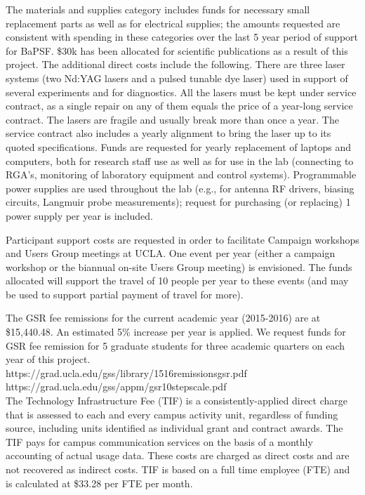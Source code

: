 \documentclass[11pt]{article}
\begin{document}
The materials and supplies category includes funds for necessary small
replacement parts as well as for electrical supplies; the amounts
requested are consistent with spending in these categories over the
last 5 year period of support for BaPSF. \$30k has been
allocated for scientific publications as a result of this project. The
additional direct costs include the following.  There are three laser
systems (two Nd:YAG lasers and a pulsed tunable dye laser) used in
support of several experiments and for diagnostics. All the lasers
must be kept under service contract, as a single repair on any of them
equals the price of a year-long service contract. The lasers are
fragile and usually break more than once a year. The service contract
also includes a yearly alignment to bring the laser up to its quoted
specifications.  Funds are requested for yearly replacement of laptops and computers, both for research staff use
as well as for use in the lab (connecting to RGA's, monitoring of
laboratory equipment and control systems).  Programmable power
supplies are used throughout the lab (e.g., for antenna RF drivers,
biasing circuits, Langmuir probe measurements); request for purchasing
(or replacing) 1 power supply per year is included.


Participant support costs are requested in order to
facilitate Campaign workshops and Users Group meetings at UCLA. One
event per year (either a campaign workshop or the biannual on-site
Users Group meeting) is envisioned.  The funds allocated will support
the travel of 10 people per year to these events (and may be used to
support partial payment of travel for more).


The GSR fee remissions for the current academic year (2015-2016) are
at \$15,440.48. An estimated 5\% increase per year is applied. We
request funds for GSR fee remission for 5 graduate students for three
academic quarters on each year of this project. \\[0.1truein]
{\ttfamily https://grad.ucla.edu/gss/library/1516remissionsgsr.pdf} \\
{\ttfamily https://grad.ucla.edu/gss/appm/gsr10stepscale.pdf} \\

The Technology Infrastructure Fee (TIF) is a consistently-applied direct charge that
is assessed to each and every campus activity unit, regardless of
funding source, including units identified as individual grant and
contract awards.  The TIF pays for campus communication services on
the basis of a monthly accounting of actual usage data.  These costs
are charged as direct costs and are not recovered as indirect costs.
TIF is based on a full time employee (FTE) and is calculated at \$33.28
per FTE per month.  
\end{document}
